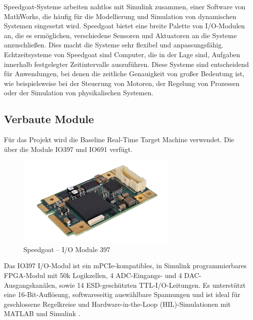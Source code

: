 Speedgoat-Systeme arbeiten nahtlos mit Simulink zusammen, einer Software von MathWorks, die häufig für die Modellierung und Simulation von dynamischen Systemen eingesetzt wird.
Speedgoat bietet eine breite Palette von I/O-Modulen an, die es ermöglichen, verschiedene Sensoren und Aktuatoren an die Systeme anzuschließen. Dies macht die Systeme sehr flexibel und anpassungsfähig.
Echtzeitsysteme von Speedgoat sind Computer, die in der Lage sind, Aufgaben innerhalb festgelegter Zeitintervalle auszuführen. Diese Systeme sind entscheidend für Anwendungen, bei denen die zeitliche Genauigkeit von großer Bedeutung ist, wie beispielsweise bei der Steuerung von Motoren, der Regelung von Prozessen oder der Simulation von physikalischen Systemen.
\newpage


\subsection{Verbaute Module}

Für das Projekt wird die Baseline Real-Time Target Machine verwendet. Die über die Module IO397 und IO691 verfügt.\\

\begin{figure}[!ht]
	\begin{center}
		\includegraphics[width=0.7\textwidth]{img/2_steuerung/goat_io397.png}
		\caption{Speedgoat – I/O Module 397 \cite{speedgoat:IO397}}
		\label{img_2_2:goat:IO397}
	\end{center}
\end{figure}

Das IO397 I/O-Modul ist ein mPCIe-kompatibles, in Simulink programmierbares FPGA-Modul mit 50k Logikzellen, 4 ADC-Eingangs- und 4 DAC-Ausgangskanälen, sowie 14 ESD-geschützten TTL-I/O-Leitungen. Es unterstützt eine 16-Bit-Auflösung, softwareseitig auswählbare Spannungen und ist ideal für geschlossene Regelkreise und Hardware-in-the-Loop (HIL)-Simulationen mit MATLAB und Simulink \cite{speedgoat:IO397}.



